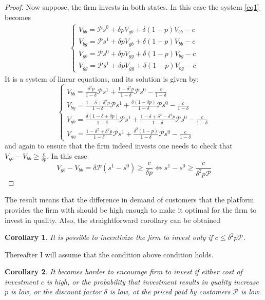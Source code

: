 \documentclass[a4paper]{article}
\newtheorem{corollary}{Corollary}[theorem]
\begin{document}
\begin{proof}
	Now suppose, the firm invests in both states. In this case the system \eqref{eq1} becomes
	\begin{align*}
	\begin{cases}
	V_{bb} = \mathcal{P}s^0 + \delta p V_{gb} + \delta(1-p)V_{bb} - c\\
	V_{bg} = \mathcal{P}s^1 + \delta p V_{gb} + \delta(1-p)V_{bb} - c\\
	V_{gb} = \mathcal{P}s^0 + \delta pV_{gg} + \delta(1-p)V_{bg} - c\\
	V_{gg} = \mathcal{P}s^1 + \delta p V_{gg} + \delta (1 - p)V_{bg} - c
	\end{cases}
	\end{align*}
	It is a system of linear equations, and its solution is given by:
	$$\begin{cases}
	V_{bb} = \frac{\delta^2p}{1-\delta}\mathcal{P}s^1 + \frac{1-\delta^2p}{1-\delta}\mathcal{P}s^0 - \frac{c}{1-\delta}\\
	V_{bg} = \frac{1-\delta + \delta^2p}{1-\delta}\mathcal{P}s^1 + \frac{\delta(1-\delta p)}{1-\delta}\mathcal{P}s^0 - \frac{c}{1-\delta}\\
	V_{gb} = \frac{\delta(1-\delta+\delta p)}{1-\delta}\mathcal{P}s^1 + \frac{1-\delta + \delta^2 - \delta^2 p}{1- \delta}\mathcal{P}s^0 - \frac{c}{1-\delta}\\
	V_{gg} = \frac{1 - \delta^2 + \delta^2 p}{1 - \delta}\mathcal{P}s^1 + \frac{\delta^2(1-p)}{1- \delta}\mathcal{P}s^0 - \frac{c}{1 - \delta}
	\end{cases}$$
	and again to ensure that the firm indeed invests one needs to check that $V_{gb} - V_{bb} \ge \frac{c}{\delta p}$. In this case $$V_{gb} - V_{bb} = \delta\mathcal{P}(s^1 - s^0) \ge \frac{c}{\delta p} \iff s^1 - s^0 \ge \frac{c}{\delta^2 p \mathcal{P}}$$
\end{proof}
The result means that the difference in demand of customers that the platform provides the firm with should be high enough to make it optimal for the firm to invest in quality. Also, the straightforward corollary can be obtained
\begin{corollary}
	It is possible to incentivize the firm to invest only if $c \le \delta^2 p \mathcal{P}$.
\end{corollary}
Thereafter I will assume that the condition above condition holds.
\begin{corollary}
	It becomes harder to encourage firm to invest if either cost of investment $c$ is high, or the probability that investment results in quality increase $p$ is low, or the discount factor $\delta$ is low, ot the priced paid by customers $\mathcal{P}$ is low.
\end{corollary}
\end{document}
